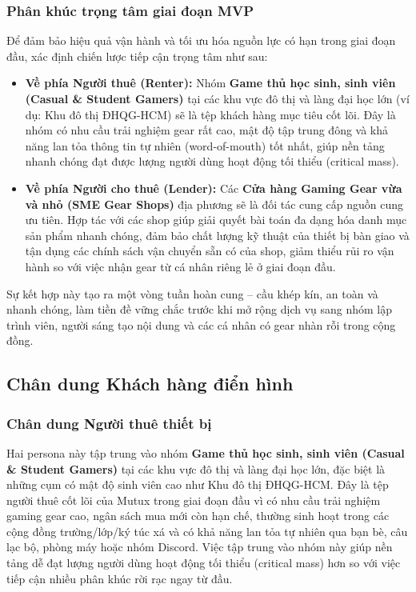 \subsubsection{Phân khúc trọng tâm giai đoạn MVP}

Để đảm bảo hiệu quả vận hành và tối ưu hóa nguồn lực có hạn trong giai đoạn đầu, \projectname{} xác định chiến lược tiếp cận trọng tâm như sau:
\begin{itemize}
    \item \textbf{Về phía Người thuê (Renter):} Nhóm \textbf{Game thủ học sinh, sinh viên (Casual \& Student Gamers)} tại các khu vực đô thị và làng đại học lớn (ví dụ: Khu đô thị ĐHQG-HCM) sẽ là tệp khách hàng mục tiêu cốt lõi. Đây là nhóm có nhu cầu trải nghiệm gear rất cao, mật độ tập trung đông và khả năng lan tỏa thông tin tự nhiên (word-of-mouth) tốt nhất, giúp nền tảng nhanh chóng đạt được lượng người dùng hoạt động tối thiểu (critical mass).
    \item \textbf{Về phía Người cho thuê (Lender):} Các \textbf{Cửa hàng Gaming Gear vừa và nhỏ (SME Gear Shops)} địa phương sẽ là đối tác cung cấp nguồn cung ưu tiên. Hợp tác với các shop giúp \projectname{} giải quyết bài toán đa dạng hóa danh mục sản phẩm nhanh chóng, đảm bảo chất lượng kỹ thuật của thiết bị bàn giao và tận dụng các chính sách vận chuyển sẵn có của shop, giảm thiểu rủi ro vận hành so với việc nhận gear từ cá nhân riêng lẻ ở giai đoạn đầu.
\end{itemize}
Sự kết hợp này tạo ra một vòng tuần hoàn cung -- cầu khép kín, an toàn và nhanh chóng, làm tiền đề vững chắc trước khi mở rộng dịch vụ sang nhóm lập trình viên, người sáng tạo nội dung và các cá nhân có gear nhàn rỗi trong cộng đồng.


\subsection{Chân dung Khách hàng điển hình}

\subsubsection{Chân dung Người thuê thiết bị}

Hai persona này tập trung vào nhóm \textbf{Game thủ học sinh, sinh viên (Casual \& Student Gamers)} tại các khu vực đô thị và làng đại học lớn, đặc biệt là những cụm có mật độ sinh viên cao như Khu đô thị ĐHQG-HCM. Đây là tệp người thuê cốt lõi của Mutux trong giai đoạn đầu vì có nhu cầu trải nghiệm gaming gear cao, ngân sách mua mới còn hạn chế, thường sinh hoạt trong các cộng đồng trường/lớp/ký túc xá và có khả năng lan tỏa tự nhiên qua bạn bè, câu lạc bộ, phòng máy hoặc nhóm Discord. Việc tập trung vào nhóm này giúp nền tảng dễ đạt lượng người dùng hoạt động tối thiểu (critical mass) hơn so với việc tiếp cận nhiều phân khúc rời rạc ngay từ đầu.

